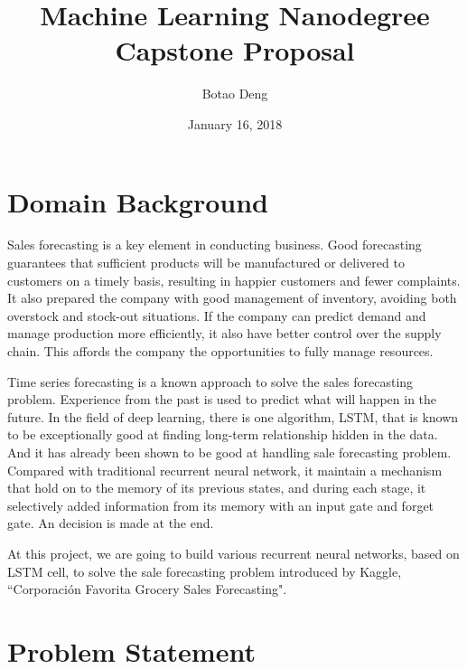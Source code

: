 \documentclass{article}
\title{Machine Learning Nanodegree \\ Capstone Proposal}
\author{Botao Deng}
\date{January 16, 2018}
\begin{document}
\maketitle

\section{Domain Background}

Sales forecasting is a key element in conducting business.\cite{beheshti2015survey} Good forecasting guarantees that sufficient products will be manufactured or delivered to customers on a timely basis, resulting in happier customers and fewer complaints. It also prepared the company with good management of inventory, avoiding both overstock and stock-out situations. If the company can predict demand and manage production more efficiently, it also have better control over the supply chain. This affords the company the opportunities to fully manage resources.

Time series forecasting is a known approach to solve the sales forecasting problem. Experience from the past is used to predict what will happen in the future. In the field of deep learning, there is one algorithm, LSTM, that is known to be exceptionally good at finding long-term relationship hidden in the data. And it has already been shown to be good at handling sale forecasting problem.\cite{tyrpakovadeep} Compared with traditional recurrent neural network, it maintain a mechanism that hold on to the memory of its previous states, and during each stage, it selectively added information from its memory with an input gate and forget gate. An decision is made at the end. 

At this project, we are going to build various recurrent neural networks, based on LSTM cell, to solve the sale forecasting problem introduced by Kaggle, ``Corporación Favorita Grocery Sales Forecasting". 

\section{Problem Statement}
\label{sec:problem-statement}
\end{document}
